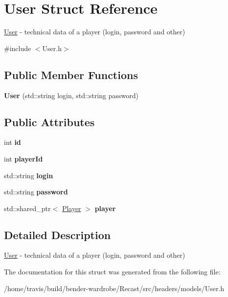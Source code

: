 \hypertarget{struct_user}{\section{User Struct Reference}
\label{struct_user}
}


\hyperlink{struct_user}{User} -\/ technical data of a player (login, password and other)  




{\ttfamily \#include $<$User.\-h$>$}

\subsection*{Public Member Functions}
\begin{DoxyCompactItemize}
\item 
\hypertarget{struct_user_a074cc382f1a4178c6af5b8d7fdc505e7}{{\bfseries User} (std\-::string login, std\-::string password)}\label{struct_user_a074cc382f1a4178c6af5b8d7fdc505e7}

\end{DoxyCompactItemize}
\subsection*{Public Attributes}
\begin{DoxyCompactItemize}
\item 
\hypertarget{struct_user_aa7e6e39b43020bbe9c3a196b3689b0f7}{int {\bfseries id}}\label{struct_user_aa7e6e39b43020bbe9c3a196b3689b0f7}

\item 
\hypertarget{struct_user_add1a0a4d41bf6d364738b19f2cee96a6}{int {\bfseries player\-Id}}\label{struct_user_add1a0a4d41bf6d364738b19f2cee96a6}

\item 
\hypertarget{struct_user_a68ef4336327a1ee8b4532a6042485f3a}{std\-::string {\bfseries login}}\label{struct_user_a68ef4336327a1ee8b4532a6042485f3a}

\item 
\hypertarget{struct_user_ac2f2e75b15e8eb6cbb030fc85a6cd59f}{std\-::string {\bfseries password}}\label{struct_user_ac2f2e75b15e8eb6cbb030fc85a6cd59f}

\item 
\hypertarget{struct_user_a55d128918fa7d3e66120d392092227fd}{std\-::shared\-\_\-ptr$<$ \hyperlink{struct_player}{Player} $>$ {\bfseries player}}\label{struct_user_a55d128918fa7d3e66120d392092227fd}

\end{DoxyCompactItemize}


\subsection{Detailed Description}
\hyperlink{struct_user}{User} -\/ technical data of a player (login, password and other) 

The documentation for this struct was generated from the following file\-:\begin{DoxyCompactItemize}
\item 
/home/travis/build/bender-\/wardrobe/\-Recast/src/headers/models/User.\-h\end{DoxyCompactItemize}
